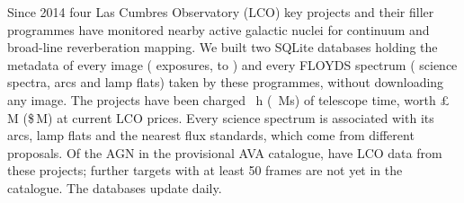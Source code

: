 Since 2014 four Las Cumbres Observatory (LCO) key projects and their filler programmes have monitored nearby
active galactic nuclei for continuum and broad-line reverberation mapping. We built two SQLite databases holding
the metadata of every image (\nImages{} exposures, \firstImage{} to \lastImage) and every FLOYDS spectrum
(\nSpectra{} science spectra, \nArcs{} arcs and \nFlats{} lamp flats) taken by these programmes, without
downloading any image. The projects have been charged \hoursTotal{}~h (\msTotal~Ms) of telescope time, worth
\pounds\gbpTotal\,M (\$\usdTotal\,M) at current LCO prices. Every science spectrum is associated with its arcs,
lamp flats and the nearest flux standards, which come from \nStdProposals{} different proposals. Of the
\nAva{} AGN in the provisional AVA catalogue, \nAvaMatched{} have LCO data from these projects; \nNotInAvaFifty{}
further targets with at least 50 frames are not yet in the catalogue. The databases update daily.
